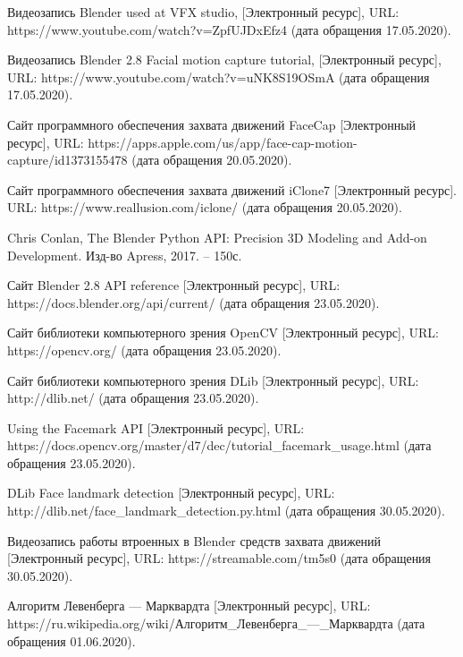 \begingroup 
\renewcommand{\section}[2]{\anonsection{Список использованных источников (старый)}}
\begin{thebibliography}{00}
	Видеозапись Blender used at VFX studio,
	[Электронный ресурс],
	URL: https://www.youtube.com/watch?v=ZpfUJDxEfz4
	(дата обращения 17.05.2020).

    Видеозапись Blender 2.8 Facial motion capture tutorial,
    [Электронный ресурс],
    URL: https://www.youtube.com/watch?v=uNK8S19OSmA
    (дата обращения 17.05.2020).
    
	Сайт программного обеспечения захвата движений FaceCap
	[Электронный ресурс],
	URL: https://apps.apple.com/us/app/face-cap-motion-capture/id1373155478
	(дата обращения 20.05.2020).

	Сайт программного обеспечения захвата движений iClone7
	[Электронный ресурс].
	URL: https://www.reallusion.com/iclone/
	(дата обращения 20.05.2020).
    
	Chris Conlan,
	The Blender Python API: Precision 3D Modeling and Add-on Development.
	Изд-во Apress, 2017. -- 150с.
	

	Сайт Blender 2.8 API reference
	[Электронный ресурс],
	URL: https://docs.blender.org/api/current/
	(дата обращения 23.05.2020).
	
	Сайт библиотеки компьютерного зрения OpenCV
	[Электронный ресурс],
	URL: https://opencv.org/
	(дата обращения 23.05.2020).
	
	Сайт библиотеки компьютерного зрения DLib
	[Электронный ресурс],
	URL: http://dlib.net/
	(дата обращения 23.05.2020).
	
	Using the Facemark API
	[Электронный ресурс],
	URL: https://docs.opencv.org/master/d7/dec/tutorial\_facemark\_usage.html
	(дата обращения 23.05.2020).

	DLib Face landmark detection
	[Электронный ресурс],
	URL: http://dlib.net/face\_landmark\_detection.py.html
	(дата обращения 30.05.2020).
	
	Видеозапись работы втроенных в Blender средств захвата движений
	[Электронный ресурс],
	URL: https://streamable.com/tm5s0
	(дата обращения 30.05.2020).
	
	Алгоритм Левенберга — Марквардта
	[Электронный ресурс],
	URL: https://ru.wikipedia.org/wiki/Алгоритм\_Левенберга\_—\_Марквардта
	(дата обращения 01.06.2020).
	

\end{thebibliography}
